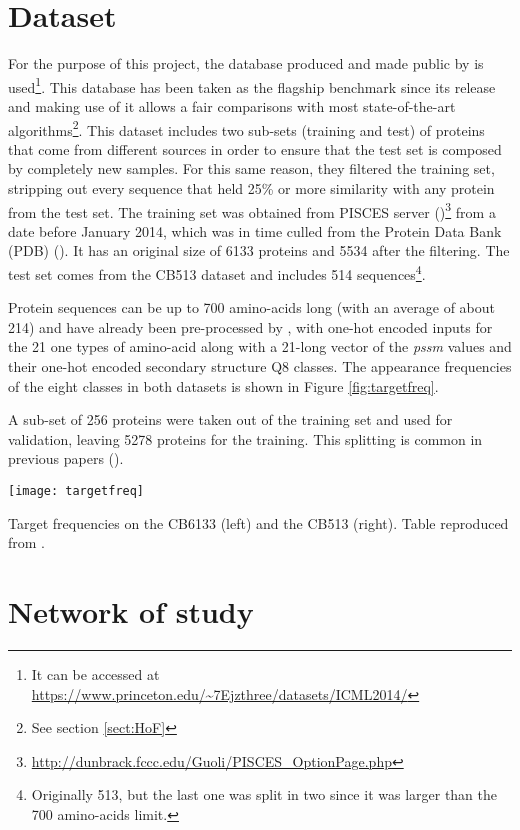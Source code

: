 \section{Dataset}
For the purpose of this project, the database produced and made public by \cite{Zhou2014} is used\footnote{It can be accessed at \url{https://www.princeton.edu/\~7Ejzthree/datasets/ICML2014/}}. This database has been taken as the flagship benchmark since its release and making use of it allows a fair comparisons with most state-of-the-art algorithms\footnote{See section \ref{sect:HoF}}. This dataset includes two sub-sets (training and test) of proteins that come from different sources in order to ensure that the test set is composed by completely new samples. For this same reason, they filtered the training set, stripping out every sequence that held 25\% or more similarity with any protein from the test set.
The training set was obtained from PISCES server (\cite{Wang2003})\footnote{\url{http://dunbrack.fccc.edu/Guoli/PISCES\_OptionPage.php}} from a date before January 2014, which was in time culled from the Protein Data Bank (PDB) (\cite{Berman2003}).
It has an original size of 6133 proteins and 5534 after the filtering. The test set comes from the CB513 dataset \cite{Cuff1999} and includes 514 sequences\footnote{Originally 513, but the last one was split in two since it was larger than the 700 amino-acids limit.}.

Protein sequences can be up to 700 amino-acids long (with an average of about 214) and have already been pre-processed by \cite{Zhou2014}, with one-hot encoded inputs for the 21 one types of amino-acid along with a 21-long vector of the \textit{pssm} values and their one-hot encoded secondary structure Q8 classes. The appearance frequencies of the eight classes in both datasets is shown in Figure \ref{fig:targetfreq}.

A sub-set of 256 proteins were taken out of the training set and used for validation, leaving 5278 proteins for the training. This splitting is common in previous papers (\cite{Zhou2014,Sønderby2014,Busia2017,Jurtz2017,Hattori2017}).
	
	\begin{table}[h]
		\centering
		\texttt{[image: targetfreq]}
		\caption{Target frequencies on the CB6133 (left) and the CB513 (right). Table reproduced from \cite{Hattori2017}.}
		\label{fig:targetfreq}
	\end{table}


\section{Network of study}\label{sect:network}

